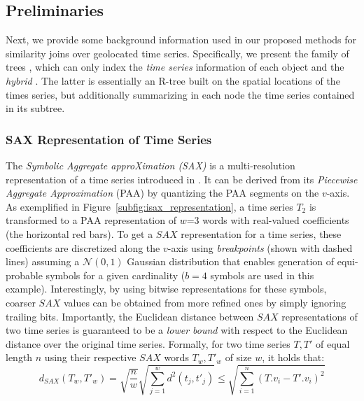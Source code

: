 \subsection{Preliminaries}
\label{sec:preliminaries}

Next, we provide some background information used in our proposed methods for similarity joins over geolocated time series. Specifically, we present the \isax family of trees \cite{shieh2008kdd,camerra2010icdm,camerra2014kais}, which can only index the {\em time series} information of each object and the {\em hybrid} \btsr \cite{chatzig17btsr}. The latter is essentially an R-tree built on the spatial locations of the times series, but additionally summarizing in each node the time series contained in its subtree.


\subsubsection{SAX Representation of Time Series}
\label{subsec:sax}

The {\em Symbolic Aggregate approXimation (SAX)} is a multi-resolution representation of a time series introduced in \cite{shieh2008kdd}. It can be derived from its {\em Piecewise Aggregate Approximation} (PAA) \cite{keogh2001paa,faloutsos2000vldb} by quantizing the PAA segments on the $v$-axis. As exemplified in Figure~\ref{subfig:isax_representation}, a time series $T_2$ is transformed to a PAA representation of $w$=3 words with real-valued coefficients (the horizontal red bars). To get a $SAX$ representation for a time series, these coefficients are discretized along the $v$-axis using {\em breakpoints} (shown with dashed lines) assuming a $\mathcal{N}(0,1)$ Gaussian distribution that enables generation of equi-probable symbols for a given cardinality ($b=4$ symbols are used in this example). Interestingly, by using bitwise representations for these symbols, coarser $SAX$ values can be obtained from more refined ones by simply ignoring trailing bits. 
Importantly, the Euclidean distance between $SAX$ representations of two time series is guaranteed to be a {\em lower bound} with respect to the Euclidean distance over the original time series. Formally, for two time series $T, T'$ of equal length $n$ using their respective $SAX$ words $T_w, T'_w$ of size $w$, it holds that:
\begin{equation} \label{eq:dist_sax}
d_{SAX}(T_w, T'_w) =\sqrt{\frac{n}{w}} \sqrt{\sum_{j=1}^{w} d^2(t_j, t'_j) }  \leq {\sqrt{\displaystyle \sum_{i=1}^{n}(T.v_i - T'.v_i)^2}}
\end{equation}

